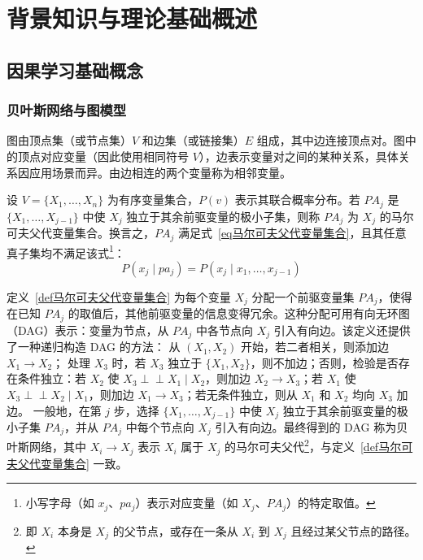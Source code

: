 \chapter{背景知识与理论基础概述}
\section{因果学习基础概念}
\subsection{贝叶斯网络与图模型}

图由顶点集（或节点集）$V$ 和边集（或链接集）$E$ 组成，其中边连接顶点对。图中的顶点对应变量（因此使用相同符号 $V$），边表示变量对之间的某种关系，具体关系因应用场景而异。由边相连的两个变量称为相邻变量。

\begin{definition}[马尔可夫父代变量集合]
	\label{def马尔可夫父代变量集合}
	设 $V = \{X_1, \dots, X_n\}$ 为有序变量集合，$P(v)$ 表示其联合概率分布。若 $PA_j$ 是 $\{X_1, \dots, X_{j-1}\}$ 中使 $X_j$ 独立于其余前驱变量的极小子集，则称 $PA_j$ 为 $X_j$ 的马尔可夫父代变量集合。换言之，$PA_j$ 满足式~\ref{eq马尔可夫父代变量集合}，且其任意真子集均不满足该式\footnote{小写字母（如 $x_j$、$pa_j$）表示对应变量（如 $X_j$、$PA_j$）的特定取值。}：
	\begin{equation}
		P(x_j \mid pa_j) = P(x_j \mid x_1, \dots, x_{j-1})
		\label{eq马尔可夫父代变量集合}
	\end{equation}
\end{definition}

定义~\ref{def马尔可夫父代变量集合} 为每个变量 $X_j$ 分配一个前驱变量集 $PA_j$，使得在已知 $PA_j$ 的取值后，其他前驱变量的信息变得冗余。这种分配可用有向无环图（DAG）表示：变量为节点，从 $PA_j$ 中各节点向 $X_j$ 引入有向边。该定义还提供了一种递归构造 DAG 的方法：
从 $(X_1, X_2)$ 开始，若二者相关，则添加边 $X_1 \to X_2$；
处理 $X_3$ 时，若 $X_3$ 独立于 $\{X_1, X_2\}$，则不加边；否则，检验是否存在条件独立：若 $X_2$ 使 $X_3 \perp\!\!\!\perp X_1 \mid X_2$，则加边 $X_2 \to X_3$；若 $X_1$ 使 $X_3 \perp\!\!\!\perp X_2 \mid X_1$，则加边 $X_1 \to X_3$；若无条件独立，则从 $X_1$ 和 $X_2$ 均向 $X_3$ 加边。
一般地，在第 $j$ 步，选择 $\{X_1, \dots, X_{j-1}\}$ 中使 $X_j$ 独立于其余前驱变量的极小子集 $PA_j$，并从 $PA_j$ 中每个节点向 $X_j$ 引入有向边。最终得到的 DAG 称为贝叶斯网络，其中 $X_i \to X_j$ 表示 $X_i$ 属于 $X_j$ 的马尔可夫父代\footnote{即 $X_i$ 本身是 $X_j$ 的父节点，或存在一条从 $X_i$ 到 $X_j$ 且经过某父节点的路径。}，与定义~\ref{def马尔可夫父代变量集合} 一致。

